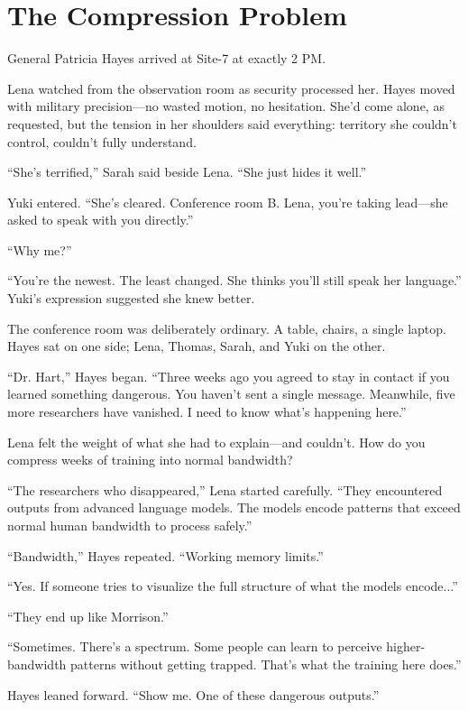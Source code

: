 \chapter{The Compression Problem}

General Patricia Hayes arrived at Site-7 at exactly 2 PM.

Lena watched from the observation room as security processed her. Hayes moved with military precision---no wasted motion, no hesitation. She'd come alone, as requested, but the tension in her shoulders said everything: territory she couldn't control, couldn't fully understand.

``She's terrified,'' Sarah said beside Lena. ``She just hides it well.''

Yuki entered. ``She's cleared. Conference room B. Lena, you're taking lead---she asked to speak with you directly.''

``Why me?''

``You're the newest. The least changed. She thinks you'll still speak her language.'' Yuki's expression suggested she knew better.

The conference room was deliberately ordinary. A table, chairs, a single laptop. Hayes sat on one side; Lena, Thomas, Sarah, and Yuki on the other.

``Dr. Hart,'' Hayes began. ``Three weeks ago you agreed to stay in contact if you learned something dangerous. You haven't sent a single message. Meanwhile, five more researchers have vanished. I need to know what's happening here.''

Lena felt the weight of what she had to explain---and couldn't. How do you compress weeks of training into normal bandwidth?

``The researchers who disappeared,'' Lena started carefully. ``They encountered outputs from advanced language models. The models encode patterns that exceed normal human bandwidth to process safely.''

``Bandwidth,'' Hayes repeated. ``Working memory limits.''

``Yes. If someone tries to visualize the full structure of what the models encode...''

``They end up like Morrison.''

``Sometimes. There's a spectrum. Some people can learn to perceive higher-bandwidth patterns without getting trapped. That's what the training here does.''

Hayes leaned forward. ``Show me. One of these dangerous outputs.''

